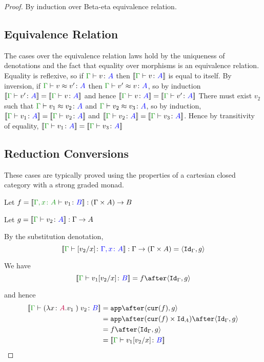 \documentclass{report}
\begin{document}
\begin{framed}
    
    \begin{proof}
        By induction over Beta-eta equivalence relation.
        \subsection{Equivalence Relation}
        The cases over the equivalence relation laws hold by the uniqueness of denotations and the fact that equality over morphisms is an equivalence relation.
        Equality is reflexive, so if $\gtyperelation{v}{A}$ then $\deno{\gtyperelation{v}{A}}$ is equal to itself.
        \case{\eqsymmetric}
        By inversion, if $\gberelation{v}{v'}{A}$ then $\gberelation{v'}{v}{A}$, so by induction $\gdenoequality{v'}{v}{A}$ and hence $\gdenoequality{v}{v'}{A}$
        \case{\eqtransitive}
        There must exist $v_2$ such that $\gberelation{v_1}{v_2}{A}$ and $\gberelation{v_2}{v_3}{A}$, so by induction,
        $\gdenoequality{v_1}{v_2}{A}$ and $\gdenoequality{v_2}{v_3}{A}$. Hence by transitivity of equality, $\gdenoequality{v_1}{v_3}{A}$
        
        \subsection{Reduction Conversions}
        These cases are typically proved using the properties of a cartesian closed category with a strong graded monad.
        
        \case{\eqbeta}
            Let $f = \deno{\typerelation{\gax}{v_1}{B}}: (\G \times A) \rightarrow B$
        
            Let $g = \deno{\gtyperelation{v_2}{A}}: \G \rightarrow A$
        
            By the substitution denotation, $$\deno{\typerelation{\G}{\ssub{x}{v_2}}{\gax}}: \G \rightarrow (\G \times A) = \pr{\idg}{g}$$
        
            We have $$\deno{\gtyperelation{v_1\ssub{x}{v_2}}{B}} = f \after \pr{\idg}{g}$$
        
            and hence
            \begin{equation}
                \begin{split}
                    \deno{\gtyperelation{\apply{(\lam{x}{A}{v_1})}{v_2}}{B}} & = \app\after\pr{\cur{f}}{g} \\
                    & = \app\after(\cur{f}\times\Id{A})\after\pr{\idg}{g}\\
                    & = f \after \pr{\idg}{g} \\
                    & = \deno{\gtyperelation{v_1\ssub{x}{v_2}}{B}}  
                \end{split}
            \end{equation}
           

\end{proof}
\end{framed}
\end{document}
